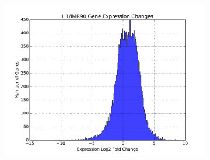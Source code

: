 \begin{figure}
  \quad

  \begin{subfigure}[b]{0.45\textwidth}
    \includegraphics[width=\textwidth]{./fig/supplementary/expressionDelta.png}\label{fig:i90h1expression}
  \end{subfigure}
\end{figure}

